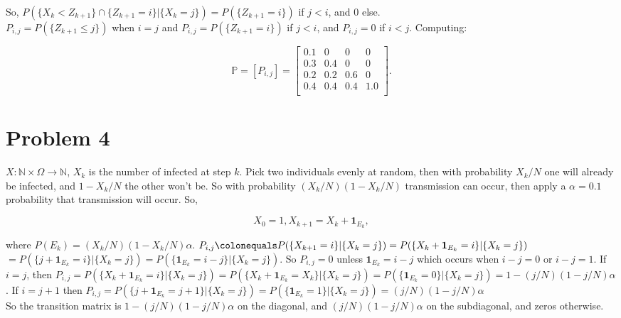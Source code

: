 \documentclass[12pt]{article}
\newcommand{\nats}[0] { \mathbb{N}}
\newcommand{\Om}[0] { \Omega }
\newcommand{\rarw}[0] { \rightarrow }
\newcommand{ \defeq }[0] { \colonequals }
\newcommand{ \cf }[1] { \mathbf{1}_{#1} }
\begin{document}
\noindent
So, $P( \{  X_k < Z_{k+1} \} \cap \{ Z_{k+1}= i \} | \{ X_{k} = j \} ) = P( \{ Z_{k+1}= i \} ) $ if $j < i$, and 0 else. \\

\noindent
$P_{i,j} = P( \{  Z_{k+1} \le j \}  ) $ when $i = j$ and $P_{i,j} = P( \{ Z_{k+1}= i \} ) $ if $j < i$, and $P_{i,j} = 0$ if $i < j$. Computing:


$$
\mathbb{P} = [P_{i,j}] = \left[ \begin{array}{cccc} 
0.1  & 0  & 0 & 0 \\
0.3 & 0.4 & 0  & 0  \\
0.2 & 0.2 & 0.6 & 0 \\
0.4 & 0.4 & 0.4 & 1.0    \\
\end{array} \right].
$$




\section*{Problem 4}

$X: \nats \times \Om \rarw \nats$, $X_k$ is the number of infected at step $k$. Pick two individuals evenly at random, then with probability $X_k/N$ one will already be infected, and $1-X_k/N$ the other won't be. So with probability $(X_k/N)(1-X_k/N)$ transmission can occur, then apply a $ \alpha = 0.1$ probability that transmission will occur. So,

$$
X_0 = 1, X_{k+1} = X_k + \cf{E_k} ,
$$

\noindent
where $P(E_k) =  (X_k/N) (1-X_k/N) \alpha $. $P_{i,j} \defeq P( \{ X_{k+1} = i\} | \{ X_k = j \} ) = P( \{  X_k + \cf{E_k} = i\} | \{ X_k = j \} )$ $ = P( \{  j + \cf{E_k} = i\} | \{ X_k = j \} ) = P( \{  \cf{E_k} = i - j \} | \{ X_k = j \} )$.  So $P_{i,j} = 0$ unless $\cf{E_k} = i-j$ which occurs when $i-j = 0$ or $i-j = 1$.   If $i = j$, then $P_{i,j} = P( \{  X_k + \cf{E_k} = i\} | \{ X_k = j \} ) = P( \{  X_k + \cf{E_k} = X_k\} | \{ X_k = j \} ) =  P( \{ \cf{E_k} = 0\} | \{ X_k = j \} )  = 1- (j/N) (1-j/N) \alpha $. If $i = j+1$ then $P_{i,j} =  P( \{  j + \cf{E_k} = j+1\} | \{ X_k = j \} ) = P( \{ \cf{E_k} = 1\} | \{ X_k = j \} ) = (j/N) (1-j/N) \alpha $ \\

So the transition matrix is $1- (j/N) (1-j/N) \alpha$ on the diagonal, and $ (j/N) (1-j/N) \alpha$ on the subdiagonal, and zeros otherwise. \\
\end{document}
